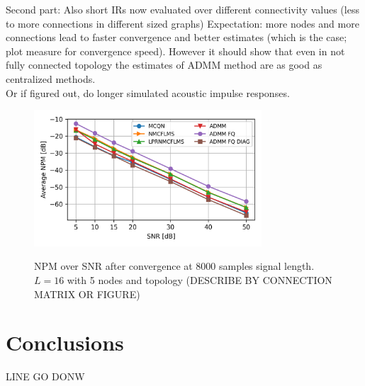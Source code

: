 \documentclass{article}
\begin{document}
\begin{attention}
    Second part: Also short IRs now evaluated over different connectivity values (less to more connections in different sized graphs)
    Expectation: more nodes and more connections lead to faster convergence and better estimates (which is the case; plot measure for convergence speed). However it should show that even in not fully connected topology the estimates of ADMM method are as good as centralized methods.\\
    Or if figured out, do longer simulated acoustic impulse responses.
\end{attention}
\begin{figure}
    \centering
    \includegraphics[width=8.5cm]{python/plots/NPM_over_SNR_L16_M5.png}\label{fig:perf_eval:NPM_over_SNR_5M}
    \caption{NPM over SNR after convergence at 8000 samples signal length. \(L=16\) with 5 nodes and topology (DESCRIBE BY CONNECTION MATRIX OR FIGURE)}
\end{figure}

\section{Conclusions}
\label{sec:conclusion}
LINE GO DONW

	
\end{document}
